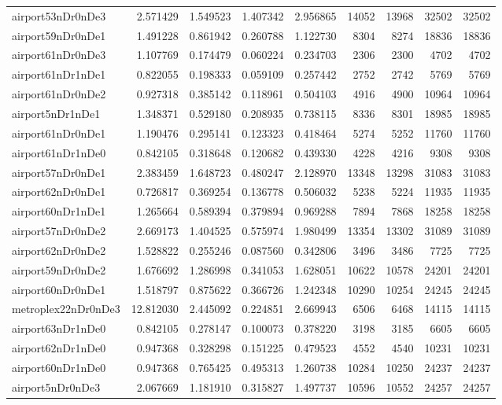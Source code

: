 \begin{longtable}{|l|r|r|r|r|r|r|r|r|}
airport53nDr0nDe3 & 2.571429 & 1.549523 & 1.407342 & 2.956865 & 14052 & 13968 & 32502 & 32502 \\
airport59nDr0nDe1 & 1.491228 & 0.861942 & 0.260788 & 1.122730 & 8304 & 8274 & 18836 & 18836 \\
airport61nDr0nDe3 & 1.107769 & 0.174479 & 0.060224 & 0.234703 & 2306 & 2300 & 4702 & 4702 \\
airport61nDr1nDe1 & 0.822055 & 0.198333 & 0.059109 & 0.257442 & 2752 & 2742 & 5769 & 5769 \\
airport61nDr0nDe2 & 0.927318 & 0.385142 & 0.118961 & 0.504103 & 4916 & 4900 & 10964 & 10964 \\
airport5nDr1nDe1 & 1.348371 & 0.529180 & 0.208935 & 0.738115 & 8336 & 8301 & 18985 & 18985 \\
airport61nDr0nDe1 & 1.190476 & 0.295141 & 0.123323 & 0.418464 & 5274 & 5252 & 11760 & 11760 \\
airport61nDr1nDe0 & 0.842105 & 0.318648 & 0.120682 & 0.439330 & 4228 & 4216 & 9308 & 9308 \\
airport57nDr0nDe1 & 2.383459 & 1.648723 & 0.480247 & 2.128970 & 13348 & 13298 & 31083 & 31083 \\
airport62nDr0nDe1 & 0.726817 & 0.369254 & 0.136778 & 0.506032 & 5238 & 5224 & 11935 & 11935 \\
airport60nDr1nDe1 & 1.265664 & 0.589394 & 0.379894 & 0.969288 & 7894 & 7868 & 18258 & 18258 \\
airport57nDr0nDe2 & 2.669173 & 1.404525 & 0.575974 & 1.980499 & 13354 & 13302 & 31089 & 31089 \\
airport62nDr0nDe2 & 1.528822 & 0.255246 & 0.087560 & 0.342806 & 3496 & 3486 & 7725 & 7725 \\
airport59nDr0nDe2 & 1.676692 & 1.286998 & 0.341053 & 1.628051 & 10622 & 10578 & 24201 & 24201 \\
airport60nDr0nDe1 & 1.518797 & 0.875622 & 0.366726 & 1.242348 & 10290 & 10254 & 24245 & 24245 \\
metroplex22nDr0nDe3 & 12.812030 & 2.445092 & 0.224851 & 2.669943 & 6506 & 6468 & 14115 & 14115 \\
airport63nDr1nDe0 & 0.842105 & 0.278147 & 0.100073 & 0.378220 & 3198 & 3185 & 6605 & 6605 \\
airport62nDr1nDe0 & 0.947368 & 0.328298 & 0.151225 & 0.479523 & 4552 & 4540 & 10231 & 10231 \\
airport60nDr1nDe0 & 0.947368 & 0.765425 & 0.495313 & 1.260738 & 10284 & 10250 & 24237 & 24237 \\
airport5nDr0nDe3 & 2.067669 & 1.181910 & 0.315827 & 1.497737 & 10596 & 10552 & 24257 & 24257 \\

\end{longtable}
